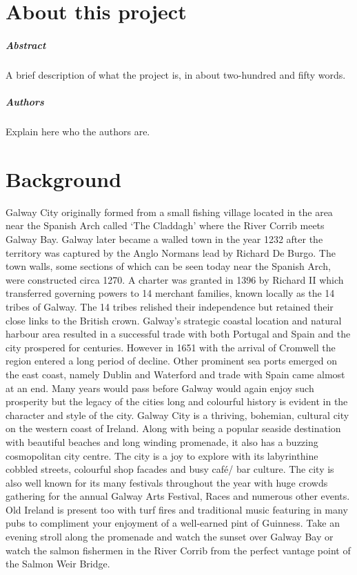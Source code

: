 
\chapter*{About this project}
\paragraph{Abstract}
A brief description of what the project is, in about two-hundred and fifty words.

\paragraph{Authors}
Explain here who the authors are.

\chapter{Background}
 \cite{galwayTourism} Galway City originally formed from a small fishing village located in the area near the Spanish Arch called ‘The Claddagh’ where the River Corrib meets Galway Bay. Galway later became a walled town in the year 1232 after the territory was captured by the Anglo Normans lead by Richard De Burgo. The town walls, some sections of which can be seen today near the Spanish Arch, were constructed circa 1270. A charter was granted in 1396 by Richard II which transferred governing powers to 14 merchant families, known locally as the 14 tribes of Galway. 
 The 14 tribes relished their independence but retained their close links to the British crown. Galway's strategic coastal location and natural harbour area resulted in a successful trade with both Portugal and Spain and the city prospered for centuries. However in 1651 with the arrival of Cromwell the region entered a long period of decline. Other prominent sea ports emerged on the east coast, namely Dublin and Waterford and trade with Spain came almost at an end. Many years would pass before Galway would again enjoy such prosperity but the legacy of the cities long and colourful history is evident in the character and style of the city. 
 Galway City is a thriving, bohemian, cultural city on the western coast of Ireland. Along with being a popular seaside destination with beautiful beaches and long winding promenade, it also has a buzzing cosmopolitan city centre. The city is a joy to explore with its labyrinthine cobbled streets, colourful shop facades and busy café/ bar culture.  The city is also well known for its many festivals throughout the year with huge crowds gathering for the annual Galway Arts Festival, Races and numerous other events. Old Ireland is present too with turf fires and traditional music featuring in many pubs to compliment your enjoyment of a well-earned pint of Guinness. Take an evening stroll along the promenade and watch the sunset over Galway Bay or watch the salmon fishermen in the River Corrib from the perfect vantage point of the Salmon Weir Bridge.
